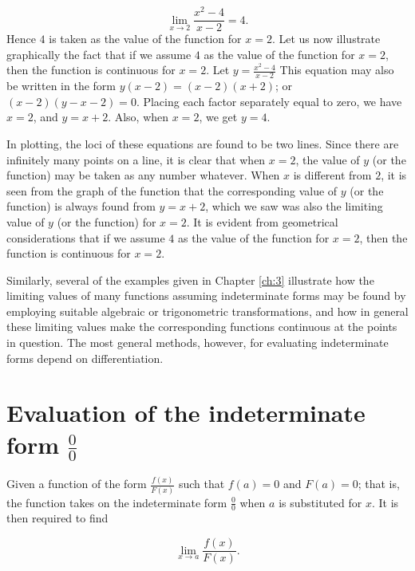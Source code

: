 \[
\lim_{x \to 2} \frac{x^2 - 4}{x - 2} = 4.
\]
Hence $4$ is taken as the value of the function for $x = 2$. 
Let us now illustrate graphically the fact that if we assume $4$ as 
the value of the function for $x = 2$, then the function is continuous for $x = 2$.
Let 
$
y = \frac{x^2 - 4}{x - 2}
$
This equation may also be written in the form
$ y(x-2)= (x-2)(x + 2)$; or $(x-2)(y-x-2)= 0$.
Placing each factor separately equal to zero, we have
$x = 2$, and $y = x + 2$. Also, when $x = 2$, we get $y=4$.

In plotting, the loci of these equations are found to be two lines. 
Since there are infinitely many points on a line, it is clear that when 
$x = 2$, the value of $y$ (or the function) may be taken as any number 
whatever. When $x$ is different from $2$, it is seen from the 
graph of the function that the corresponding value of $y$ 
(or the function) is always found from
$y = x + 2$,
which we saw was also the limiting value of $y$ (or the function) for $x = 2$.
It is evident from geometrical considerations that if we assume $4$ 
as the value of the function for $x = 2$, then the function is continuous for $x = 2$.

Similarly, several of the examples given in Chapter \ref{ch:3} illustrate 
how the limiting values of many functions assuming indeterminate forms 
may be found by employing suitable algebraic or trigonometric transformations, 
and how in general these limiting values make the corresponding functions 
continuous at the points in question. The most general methods, however, 
for evaluating indeterminate forms depend on differentiation.

\section{Evaluation of the indeterminate form $\frac{0}{0}$}
\label{sec:111}

Given a function of the form $\frac{f(x)}{F(x)}$ such that 
$f(a) = 0$ and $F(a) = 0$; that is, the function takes on the indeterminate 
form $\frac{0}{0}$ when $a$ is substituted for $x$. It is then required to find

\[
\lim_{x \to a} \frac{f(x)}{F(x)}.
\]


